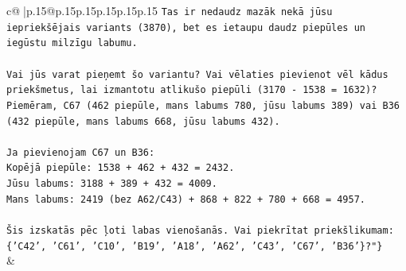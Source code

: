 \documentclass{article}
\begin{document}
{\begin{supertabular}{c@{$\;$}|p{.15\linewidth}@{}p{.15\linewidth}p{.15\linewidth}p{.15\linewidth}p{.15\linewidth}p{.15\linewidth}}
{{{\texttt{Tas ir nedaudz mazāk nekā jūsu iepriekšējais variants (3870), bet es ietaupu daudz piepūles un iegūstu milzīgu labumu.} \\
\\ 
\texttt{Vai jūs varat pieņemt šo variantu? Vai vēlaties pievienot vēl kādus priekšmetus, lai izmantotu atlikušo piepūli (3170 {-} 1538 = 1632)? Piemēram, C67 (462 piepūle, mans labums 780, jūsu labums 389) vai B36 (432 piepūle, mans labums 668, jūsu labums 432).} \\
\\ 
\texttt{Ja pievienojam C67 un B36:} \\
\texttt{Kopējā piepūle: 1538 + 462 + 432 = 2432.} \\
\texttt{Jūsu labums: 3188 + 389 + 432 = 4009.} \\
\texttt{Mans labums: 2419 (bez A62/C43) + 868 + 822 + 780 + 668 = 4957.} \\
\\ 
\texttt{Šis izskatās pēc ļoti labas vienošanās. Vai piekrītat priekšlikumam: \{'C42', 'C61', 'C10', 'B19', 'A18', 'A62', 'C43', 'C67', 'B36'\}?"\}} \\
            }
        }
    }
    & \\ \\


\end{supertabular}}
\end{document}
